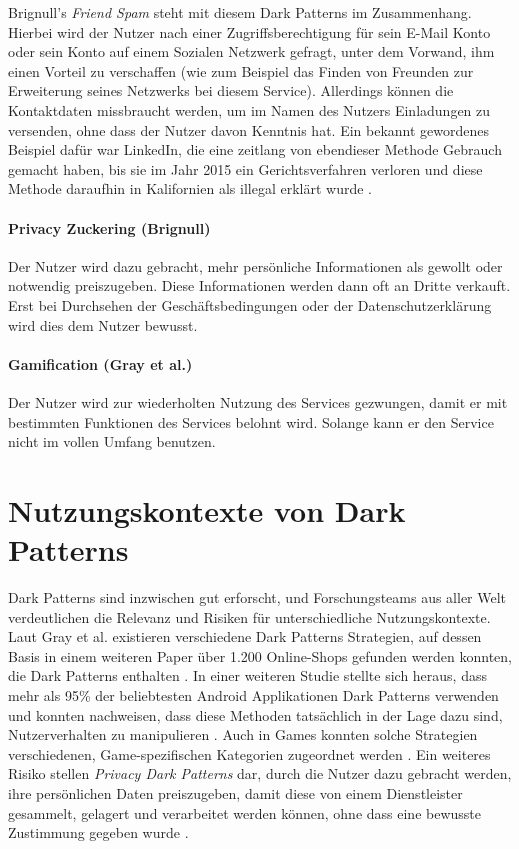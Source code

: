 \documentclass[a4paper]{article}
\begin{document}
Brignull's \textit{Friend Spam} steht mit diesem Dark Patterns im Zusammenhang. Hierbei wird der Nutzer nach einer Zugriffsberechtigung für sein E-Mail Konto oder sein Konto auf einem Sozialen Netzwerk gefragt, unter dem Vorwand, ihm einen Vorteil zu verschaffen (wie zum Beispiel das Finden von Freunden zur Erweiterung seines Netzwerks bei diesem Service). Allerdings können die Kontaktdaten missbraucht werden, um im Namen des Nutzers Einladungen zu versenden, ohne dass der Nutzer davon Kenntnis hat.
Ein bekannt gewordenes Beispiel dafür war LinkedIn, die eine zeitlang von ebendieser Methode Gebrauch gemacht haben, bis sie im Jahr 2015 ein Gerichtsverfahren verloren und diese Methode daraufhin in Kalifornien als illegal erklärt wurde \cite{brignull5}.   

\paragraph{Privacy Zuckering (Brignull)}
\label{para:privacy_zuckering}
Der Nutzer wird dazu gebracht, mehr persönliche Informationen als gewollt oder notwendig preiszugeben. Diese Informationen werden dann oft an Dritte verkauft. Erst bei Durchsehen der Geschäftsbedingungen oder der Datenschutzerklärung wird dies dem Nutzer bewusst.

\paragraph{Gamification (Gray et al.)}
\label{para:gamification}
Der Nutzer wird zur wiederholten Nutzung des Services gezwungen, damit er mit bestimmten Funktionen des Services belohnt wird. Solange kann er den Service nicht im vollen Umfang benutzen. 


\section{Nutzungskontexte von Dark Patterns} %
\label{sec:nutzungskontexte_von_dark_patterns}
Dark Patterns sind inzwischen gut erforscht, und Forschungsteams aus aller Welt verdeutlichen die Relevanz und Risiken für unterschiedliche Nutzungskontexte. Laut Gray et al. existieren verschiedene Dark Patterns Strategien, auf dessen Basis in einem weiteren Paper über 1.200 Online-Shops gefunden werden konnten, die Dark Patterns enthalten \cite{gray}\cite{mathur}. In einer weiteren Studie stellte sich heraus, dass mehr als 95\% der beliebtesten Android Applikationen Dark Patterns verwenden und konnten nachweisen, dass diese Methoden tatsächlich in der Lage dazu sind, Nutzerverhalten zu manipulieren \cite{geronimo}. Auch in Games konnten solche Strategien verschiedenen, Game-spezifischen Kategorien zugeordnet werden \cite{zagal}. Ein weiteres Risiko stellen \textit{Privacy Dark Patterns} dar, durch die Nutzer dazu gebracht werden, ihre persönlichen Daten preiszugeben, damit diese von einem Dienstleister gesammelt, gelagert und verarbeitet werden können, ohne dass eine bewusste Zustimmung gegeben wurde \cite{boesch}. 
\end{document}
